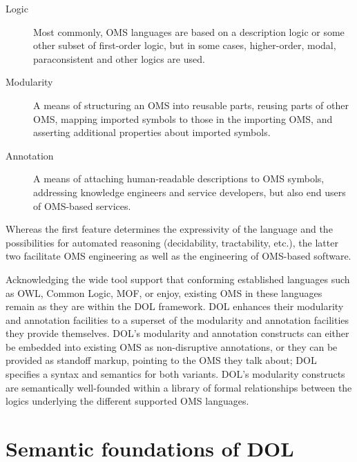 \documentclass[10pt,fleqn,%
\ifpretendfinal
final%
\else
draft%
\fi,
]{scrreprt}
\begin{document}
\begin{description}
\item[Logic] Most commonly, OMS languages are based on a description logic or some other subset of first-order logic, but in some cases, higher-order, modal, paraconsistent and other logics are used.
\item[Modularity] A means of structuring an OMS into reusable parts, reusing parts of other OMS, mapping imported symbols to those in the importing OMS, and asserting additional properties about imported symbols.
\item[Annotation] A means of attaching human-readable descriptions to OMS symbols, addressing knowledge engineers and service developers, but also end users of OMS-based services.
\end{description}
Whereas the first feature determines the expressivity of the language and the possibilities for automated reasoning (decidability, tractability, etc.), the latter two facilitate OMS engineering as well as the engineering of OMS-based software.

Acknowledging the wide tool support that conforming established languages such as OWL, Common Logic, MOF, or \CASL{} enjoy, existing OMS in these languages remain as they are within the DOL framework. DOL enhances their modularity and annotation facilities to a superset of the modularity and annotation facilities they provide themselves. 
DOL's modularity and annotation constructs can either be embedded into existing OMS as non-disruptive annotations, or they can be provided as standoff markup, pointing to the OMS they talk about; DOL specifies a syntax and semantics for both variants. DOL's modularity constructs are semantically well-founded within a library of formal relationships between the logics underlying the different supported OMS languages.


\section{Semantic foundations of DOL}
\end{document}
